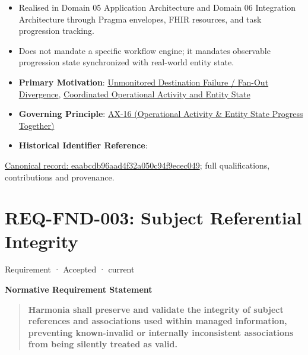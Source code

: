 \begin{itemize}


\item Realised in Domain 05 Application Architecture and Domain 06 Integration Architecture through Pragma envelopes, FHIR \texttt{} resources, and task progression tracking.

\item 

Does not mandate a specific workflow engine; it mandates observable progression state synchronized with real-world entity state.




\item 

\textbf{Primary Motivation}: \href{\detokenize{../../../../../docs/markdown/01-motivation/drivers-assessments/assessments.md}}{Unmonitored Destination Failure / Fan-Out Divergence}, \href{\detokenize{../../../../../docs/markdown/01-motivation/drivers-assessments/drivers.md}}{Coordinated Operational Activity and Entity State}




\item \textbf{Governing Principle}: \hyperref[element:de7e90f46127455a9ec9ad3b9b48ba54]{AX-16 (Operational Activity \& Entity State Progress Together)}

\item \textbf{Historical Identifier Reference}: \texttt{}

\end{itemize}

{\footnotesize \href{../../../../continuum/motivation/requirement/eaabcdb96aad4f32a050c94f9ecec049.md}{Canonical record: eaabcdb96aad4f32a050c94f9ecec049}; full qualifications, contributions and provenance.}\par
\section{REQ-FND-003: Subject Referential Integrity}

\label{element:43ecbfe8f9b14fcbbc59ee0c03c8774b}
{\small Requirement · Accepted · current}\par

\par\medskip\textbf{Normative Requirement Statement}\par


\begin{quote}


\textbf{Harmonia shall preserve and validate the integrity of subject references and associations used within managed information, preventing known-invalid or internally inconsistent associations from being silently treated as valid.}



\end{quote}


